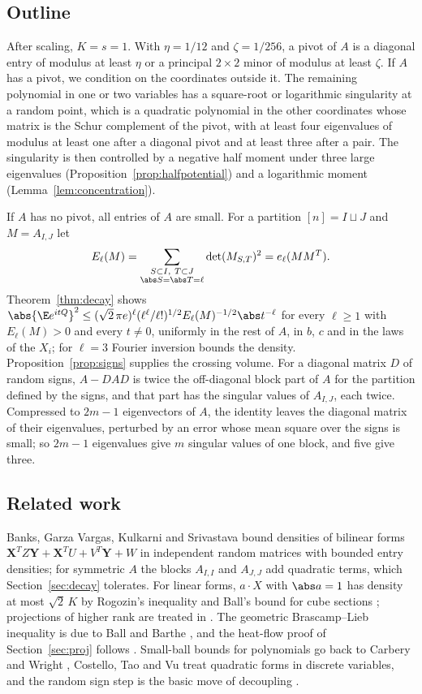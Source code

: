 \subsection*{Outline}
After scaling, $K=s=1$. With $\eta=1/12$ and $\zeta=1/256$, a pivot of $A$ is a diagonal entry of modulus at least $\eta$ or a principal $2\times2$ minor of modulus at least $\zeta$. If $A$ has a pivot, we condition on the coordinates outside it. The remaining polynomial in one or two variables has a square-root or logarithmic singularity at a random point, which is a quadratic polynomial in the other coordinates whose matrix is the Schur complement of the pivot, with at least four eigenvalues of modulus at least one after a diagonal pivot and at least three after a pair. The singularity is then controlled by a negative half moment under three large eigenvalues (Proposition~\ref{prop:halfpotential}) and a logarithmic moment (Lemma~\ref{lem:concentration}).

If $A$ has no pivot, all entries of $A$ are small. For a partition $[n]=I\sqcup J$ and $M=A_{I,J}$ let
\[
E_\ell(M)=\sum_{\substack{S\subset I,\ T\subset J\\ \abs S=\abs T=\ell}}\det(M_{S,T})^2=e_\ell(MM^T).
\]
Theorem~\ref{thm:decay} shows $\abs{\E e^{itQ}}^2\le(\sqrt2\,\pi e)^\ell(\ell^\ell/\ell!)^{1/2}E_\ell(M)^{-1/2}\abs t^{-\ell}$ for every $\ell\ge1$ with $E_\ell(M)>0$ and every $t\ne0$, uniformly in the rest of $A$, in $b$, $c$ and in the laws of the $X_i$; for $\ell=3$ Fourier inversion bounds the density. Proposition~\ref{prop:signs} supplies the crossing volume. For a diagonal matrix $D$ of random signs, $A-DAD$ is twice the off-diagonal block part of $A$ for the partition defined by the signs, and that part has the singular values of $A_{I,J}$, each twice. Compressed to $2m-1$ eigenvectors of $A$, the identity leaves the diagonal matrix of their eigenvalues, perturbed by an error whose mean square over the signs is small; so $2m-1$ eigenvalues give $m$ singular values of one block, and five give three.

\subsection*{Related work}
Banks, Garza Vargas, Kulkarni and Srivastava \cite[Theorem~2.1]{BGKS} bound densities of bilinear forms $\mathbf X^T Z\mathbf Y+\mathbf X^TU+V^T\mathbf Y+W$ in independent random matrices with bounded entry densities; for symmetric $A$ the blocks $A_{I,I}$ and $A_{J,J}$ add quadratic terms, which Section~\ref{sec:decay} tolerates. For linear forms, $a\cdot X$ with $\abs a=1$ has density at most $\sqrt2\,K$ by Rogozin's inequality \cite{Rogozin} and Ball's bound for cube sections \cite{Ball}; projections of higher rank are treated in \cite{RV,LPP}. The geometric Brascamp--Lieb inequality is due to Ball \cite{Ball} and Barthe \cite{Barthe}, and the heat-flow proof of Section~\ref{sec:proj} follows \cite{CLL,BCCT}. Small-ball bounds for polynomials go back to Carbery and Wright \cite{CW}, Costello, Tao and Vu \cite{CTV} treat quadratic forms in discrete variables, and the random sign step is the basic move of decoupling \cite{DG}.

